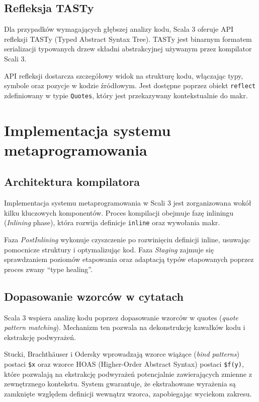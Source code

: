 \subsection{Refleksja TASTy}\label{subsec:refleksja-tasty}
Dla przypadków wymagających głębszej analizy kodu, Scala 3 oferuje API refleksji TASTy (Typed Abstract Syntax Tree)\cite{scala3-reflection,epfl-dotty-reflection,scala3-guides-reflection}.
TASTy jest binarnym formatem serializacji typowanych drzew składni abstrakcyjnej używanym przez kompilator Scali 3\cite{stucki2020thesis}.

API refleksji dostarcza szczegółowy widok na strukturę kodu, włączając typy, symbole oraz pozycje w kodzie źródłowym\cite{scala3-reflection,scala3-guides-reflection}.
Jest dostępne poprzez obiekt \texttt{reflect} zdefiniowany w typie \texttt{Quotes}, który jest przekazywany kontekstualnie do makr\cite{scala3-reflection,scala3-guides-reflection}.


\section{Implementacja systemu metaprogramowania}\label{sec:implementacja-systemu-metaprogramowania}

\subsection{Architektura kompilatora}\label{subsec:architektura-kompilatora}
Implementacja systemu metaprogramowania w Scali 3 jest zorganizowana wokół kilku kluczowych komponentów\cite{stucki2020thesis}.
Proces kompilacji obejmuje fazę inliningu (\textit{Inlining} phase), która rozwija definicje \verb|inline| oraz wywołania makr\cite{dotty-compiler-phases}.

Faza \textit{PostInlining} wykonuje czyszczenie po rozwinięciu definicji inline, usuwając pomocnicze struktury i optymalizując kod\cite{dotty-compiler-phases}.
Faza \textit{Staging} zajmuje się sprawdzaniem poziomów etapowania oraz adaptacją typów etapowanych poprzez proces zwany ``type healing''\cite{stucki2020thesis,dotty-compiler-phases}.

\subsection{Dopasowanie wzorców w cytatach}\label{subsec:dopasowanie-wzorcow-w-cytatach}
Scala 3 wspiera analizę kodu poprzez dopasowanie wzorców w quotes (\textit{quote pattern matching})\cite{stucki2020thesis,stucki2021multistage}.
Mechanizm ten pozwala na dekonstrukcję kawałków kodu i ekstrakcję podwyrażeń\cite{stucki2021multistage}.

Stucki, Brachthäuser i Odersky\cite{stucki2021multistage} wprowadzają wzorce wiążące (\textit{bind patterns}) postaci \verb|$x| oraz wzorce HOAS (Higher-Order Abstract Syntax) postaci \verb|$f(y)|, które pozwalają na ekstrakcję podwyrażeń potencjalnie zawierających zmienne z zewnętrznego kontekstu\cite{stucki2021multistage}.
System gwarantuje, że ekstrahowane wyrażenia są zamknięte względem definicji wewnątrz wzorca, zapobiegając wyciekom zakresu\cite{stucki2021multistage}.


